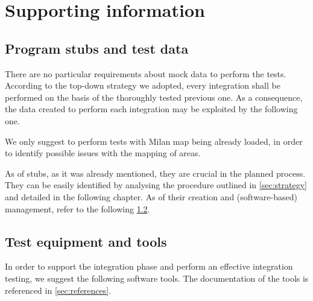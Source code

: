 \chapter{Supporting information}\label{chap:support}

\section{Program stubs and test data}\label{chap:stubs}
There are no particular requirements about mock data to perform the tests. According to the \mbox{top-down} strategy we adopted, every integration shall be performed on the basis of the thoroughly tested previous one. As a consequence, the data created to perform each integration may be exploited by the following one. 

We only suggest to perform tests with Milan map being already loaded, in order to identify possible issues with the mapping of areas. 

As of stubs, as it was already mentioned, they are crucial in the planned process. They can be easily identified by analysing the procedure outlined in \cref{sec:strategy} and detailed in the following chapter. As of their creation and (software-based) management, refer to the following \cref{chap:tools}.





\section{Test equipment and tools}\label{chap:tools}

In order to support the integration phase and perform an effective integration testing, we suggest the following software tools. The documentation of the tools is referenced in \cref{sec:references}.


